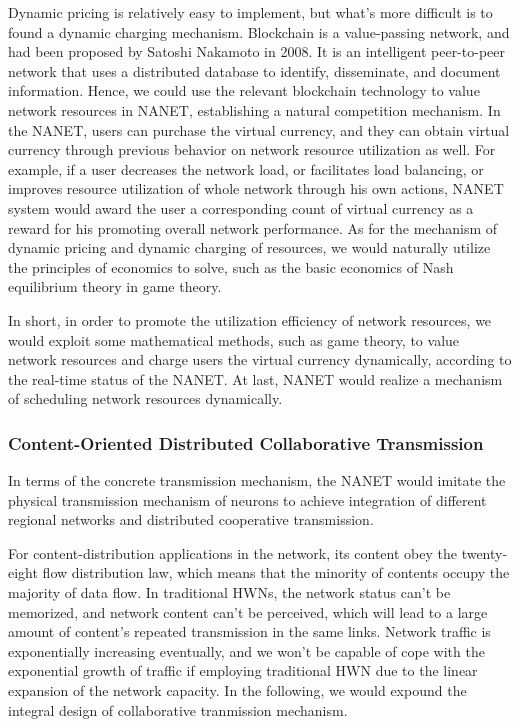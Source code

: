\documentclass[journal,comsoc]{IEEEtran}
\begin{document}
				Dynamic pricing is relatively easy to implement, but what's more difficult is to found a dynamic charging mechanism.
				Blockchain is a value-passing network, and had been proposed by Satoshi Nakamoto in 2008\cite{nakamoto2008bitcoin}. 
				It is an intelligent peer-to-peer network that uses a distributed database to identify, disseminate, and document information. 
				Hence, we could use the relevant blockchain technology to value network resources in NANET, establishing a natural competition mechanism.
				In the NANET, users can purchase the virtual currency, and they can obtain virtual currency through previous behavior on network resource utilization as well.
				For example, if a user decreases the network load, or facilitates load balancing, or improves resource utilization of whole network through his own actions, 
				NANET system would award the user a corresponding count of virtual currency as a reward for his promoting overall network performance. 
				As for the mechanism of dynamic pricing and dynamic charging of resources, 
				we would naturally utilize the principles of economics to solve, such as the basic economics of Nash equilibrium theory in game theory\cite{gibbons1992primer}\cite{nash1951non}.
				
				In short, in order to promote the utilization efficiency of network resources, 
				we would exploit some mathematical methods, such as game theory, to value network resources and charge users the virtual currency dynamically, according to the real-time status of the NANET.
				At last, NANET would realize a mechanism of scheduling network resources dynamically.
			
			\subsubsection{Content-Oriented Distributed Collaborative Transmission}
			
				In terms of the concrete transmission mechanism, the NANET would imitate the physical transmission mechanism of neurons 
				to achieve integration of different regional networks and distributed cooperative transmission.
		
				For content-distribution applications in the network, its content obey the twenty-eight flow distribution law, which means that the minority of contents occupy the majority of data flow.
				In traditional HWNs, the network status can't be memorized, and network content can't be perceived, which will lead to a large amount of content's repeated transmission in the same links.
				Network traffic is exponentially increasing eventually, and we won't be capable of cope with the exponential growth of traffic if employing traditional HWN due to the linear expansion of the network capacity. In the following, we would expound the integral design of collaborative tranmission mechanism.
				
\end{document}
